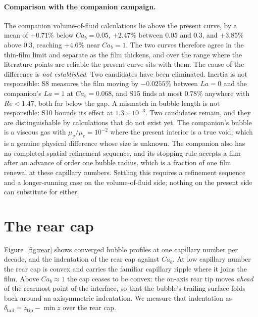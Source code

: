 \documentclass[11pt,a4paper]{article}
\begin{document}
\paragraph{Comparison with the companion campaign.} The companion
volume-of-fluid calculations lie above the present curve, by a mean of
$+0.71\%$ below $Ca_b=0.05$, $+2.47\%$ between $0.05$ and $0.3$, and $+3.85\%$
above $0.3$, reaching $+4.6\%$ near $Ca_b=1$. The two curves therefore agree in
the thin-film limit and separate as the film thickens, and over the range where
the literature points are reliable the present curve sits with them. The cause
of the difference is \emph{not established}. Two candidates have been
eliminated. Inertia is not responsible: S8 measures the film moving by
$-0.0255\%$ between $La=0$ and the companion's $La=1$ at $Ca_b=0.068$, and S15
finds at most $0.78\%$ anywhere with $Re<1.47$, both far below the gap. A
mismatch in bubble length is not responsible: S10 bounds its effect at
$1.3\times10^{-3}$. Two candidates remain, and they are distinguishable by
calculations that do not exist yet. The companion's bubble is a viscous gas
with $\mu_g/\mu_c=10^{-2}$ where the present interior is a true void, which is
a genuine physical difference whose size is unknown. The companion also has no
completed spatial refinement sequence, and its stopping rule accepts a film
after an advance of order one bubble radius, which is a fraction of one film
renewal at these capillary numbers. Settling this requires a refinement
sequence and a longer-running case on the volume-of-fluid side; nothing on the
present side can substitute for either.

\section{The rear cap}
\label{sec:rear}

Figure~\ref{fig:rear} shows converged bubble profiles at one capillary number
per decade, and the indentation of the rear cap against $Ca_b$. At low
capillary number the rear cap is convex and carries the familiar capillary
ripple where it joins the film. Above $Ca_b\approx1$ the cap ceases to be
convex: the on-axis rear tip moves \emph{ahead} of the rearmost point of the
interface, so that the bubble's trailing surface folds back around an
axisymmetric indentation. We measure that indentation as
$\delta_{\mathrm{tail}}=z_{\mathrm{tip}}-\min z$ over the rear cap.
\end{document}
